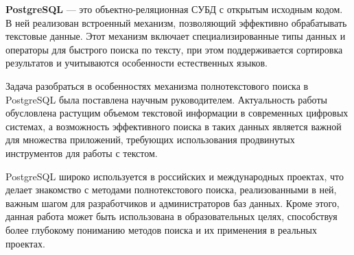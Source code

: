\textbf{PostgreSQL} --- это объектно-реляционная СУБД с открытым исходным кодом.
В ней реализован встроенный механизм, позволяющий эффективно обрабатывать текстовые данные.
Этот механизм включает специализированные типы данных и операторы для быстрого поиска по тексту, при этом поддерживается сортировка результатов и учитываются особенности естественных языков.

Задача разобраться в особенностях механизма полнотекстового поиска в PostgreSQL была поставлена научным руководителем.
Актуальность работы обусловлена растущим объемом текстовой информации в современных цифровых системах, а возможность эффективного поиска в таких данных является важной для множества приложений, требующих использования продвинутых инструментов для работы с текстом.

PostgreSQL широко используется в российских и международных проектах, что делает знакомство с методами полнотекстового поиска, реализованными в ней, важным шагом для разработчиков и администраторов баз данных.
Кроме этого, данная работа может быть использована в образовательных целях, способствуя более глубокому пониманию методов поиска и их применения в реальных проектах.
